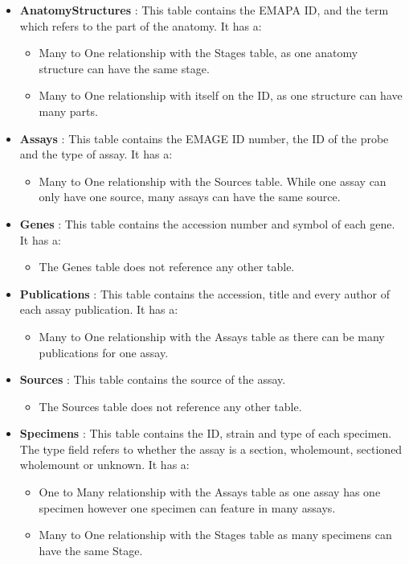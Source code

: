 \begin{itemize}
\item \textbf{AnatomyStructures} : This table contains the EMAPA ID, and the term which refers to the part of the anatomy. It has a:
\begin{itemize}
\item Many to One relationship with the Stages table, as one anatomy structure can have the same stage.
\item Many to One relationship with itself on the ID, as one structure can have many parts.
\end{itemize} 

\item \textbf{Assays} : This table contains the EMAGE ID number, the ID of the probe and the type of assay. It has a:
\begin{itemize}
\item Many to One relationship with the Sources table. While one assay can only have one source, many assays can have the same source.
\end{itemize} 

\item \textbf{Genes} : This table contains the accession number and symbol of each gene. It has a:
\begin{itemize}
\item The Genes table does not reference any other table.
\end{itemize} 

\item \textbf{Publications} : This table contains the accession, title and every author of each assay publication. It has a:
\begin{itemize}
\item Many to One relationship with the Assays table as there can be many publications for one assay.
\end{itemize} 

\item \textbf{Sources} : This table contains the source of the assay.
\begin{itemize}
\item The Sources table does not reference any other table.
\end{itemize} 

\item \textbf{Specimens} :  This table contains the ID, strain and type of each specimen. The type field refers to whether the assay is a section, wholemount, sectioned wholemount or unknown. It has a:
\begin{itemize}
\item One to Many relationship with the Assays table as one assay has one specimen however one specimen can feature in many assays.
\item Many to One relationship with the Stages table as many specimens can have the same Stage.
\end{itemize} 


\end{itemize}
